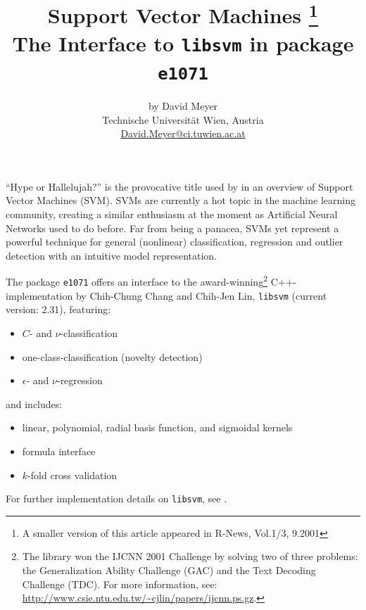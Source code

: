 \documentclass[a4paper]{article}
\newcommand{\pkg}[1]{\texttt{#1}}
\begin{document}



\title{Support Vector Machines
  \footnote{A smaller version of this
    article appeared in R-News, Vol.1/3, 9.2001}\\ 
\large The Interface to \texttt{libsvm} in package \pkg{e1071}}
\author{by David Meyer\\
  Technische Universit\"at Wien, Austria\\
\url{David.Meyer@ci.tuwien.ac.at}
}
\maketitle
\sloppy

``Hype or Hallelujah?'' is the provocative title used by
\cite{svm:bennett+campbell:2000} in an overview of Support Vector
Machines (SVM).
SVMs are currently a hot topic in the machine learning community,
creating a similar enthusiasm at the moment as Artificial Neural
Networks used to do before. Far from being a panacea, SVMs yet
represent a powerful technique for
general (nonlinear) classification, regression and outlier detection with an intuitive
model representation.


The package \pkg{e1071} offers an interface to the
award-winning\footnote{The library won the IJCNN 2001 Challenge by solving two of
  three problems: the Generalization Ability Challenge (GAC) and the Text
  Decoding Challenge (TDC). For more information, see: \url{http://www.csie.ntu.edu.tw/~cjlin/papers/ijcnn.ps.gz}.}
C++-implementation by Chih-Chung Chang and Chih-Jen Lin,
\texttt{libsvm} (current version: 2.31), featuring:
\begin{itemize}
\item $C$- and $\nu$-classification
\item one-class-classification (novelty detection)
\item $\epsilon$- and $\nu$-regression
\end{itemize}
and includes:
\begin{itemize}
\item linear, polynomial, radial basis function, and sigmoidal kernels
\item formula interface
\item $k$-fold cross validation
\end{itemize}
For further implementation details on \texttt{libsvm}, see \cite{svm:chang+lin:2001}.
\end{document}
